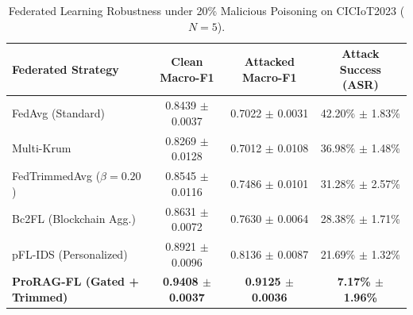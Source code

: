 \begin{table}[t]
\centering
\small
\caption{Federated Learning Robustness under 20\% Malicious Poisoning on CICIoT2023 ($N=5$).}
\label{tab:fl_poisoning_robustness}
\begin{tabular}{lccc}
\toprule
\textbf{Federated Strategy} & \textbf{Clean Macro-F1} & \textbf{Attacked Macro-F1} & \textbf{Attack Success (ASR)} \\
\midrule
FedAvg (Standard) & 0.8439 $\pm$ 0.0037 & 0.7022 $\pm$ 0.0031 & 42.20\% $\pm$ 1.83\% \\
Multi-Krum & 0.8269 $\pm$ 0.0128 & 0.7012 $\pm$ 0.0108 & 36.98\% $\pm$ 1.48\% \\
FedTrimmedAvg ($\beta=0.20$) & 0.8545 $\pm$ 0.0116 & 0.7486 $\pm$ 0.0101 & 31.28\% $\pm$ 2.57\% \\
Bc2FL (Blockchain Agg.) & 0.8631 $\pm$ 0.0072 & 0.7630 $\pm$ 0.0064 & 28.38\% $\pm$ 1.71\% \\
pFL-IDS (Personalized) & 0.8921 $\pm$ 0.0096 & 0.8136 $\pm$ 0.0087 & 21.69\% $\pm$ 1.32\% \\
\midrule
\textbf{ProRAG-FL (Gated + Trimmed)} & \textbf{0.9408 $\pm$ 0.0037} & \textbf{0.9125 $\pm$ 0.0036} & \textbf{7.17\% $\pm$ 1.96\%} \\
\bottomrule
\end{tabular}
\end{table}
